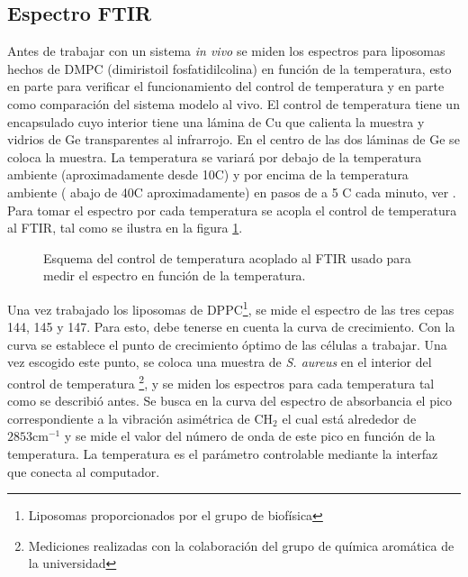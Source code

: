 \documentclass[%
 reprint,
 amsmath,amssymb,
 aps,
]{revtex4-2}
\begin{document}
 \subsection{Espectro FTIR}
Antes de trabajar con un sistema \textit{in vivo} se miden los espectros para liposomas hechos de  DMPC (dimiristoil fosfatidilcolina) en funci\'{o}n de la temperatura, esto en parte para verificar el funcionamiento del control de temperatura y en parte como comparaci\'{o}n del sistema modelo al vivo. El control de temperatura tiene un encapsulado cuyo interior tiene una l\'{a}mina de Cu que calienta la muestra y vidrios de Ge transparentes al infrarrojo. En el centro de las dos l\'{a}minas de Ge se coloca la muestra.  La temperatura se variar\'{a} por debajo de la temperatura ambiente (aproximadamente desde 10\textdegree C) y por encima de la temperatura ambiente ( abajo de 40\textdegree C aproximadamente) en pasos de a 5 \textdegree C cada minuto, ver \cite{Ocampo2010TheAureus}. Para tomar el espectro por cada temperatura se acopla el control de temperatura al FTIR, tal como se ilustra en la figura \ref{fig:mont2}.\\
\begin{figure}
 
  \caption{Esquema del control de temperatura acoplado al FTIR usado para medir el espectro en funci\'{o}n de la temperatura.}
  \label{fig:mont2}
\end{figure}
Una vez trabajado los liposomas de DPPC\footnote{Liposomas proporcionados por el grupo de biof\'{i}sica}, se mide el espectro de las tres cepas 144, 145 y 147. Para esto, debe tenerse en cuenta la curva de crecimiento. Con la curva se establece el punto de crecimiento \'{o}ptimo de las c\'{e}lulas a trabajar. Una vez escogido este punto, se coloca una muestra de \textit{S. aureus} en el interior del control de temperatura \footnote{Mediciones realizadas con la colaboraci\'{o}n del grupo de qu\'{i}mica arom\'{a}tica de la universidad},  y se miden los espectros para cada temperatura tal como se describi\'{o} antes.
Se busca en la curva del espectro de absorbancia el pico correspondiente a la vibraci\'{o}n asim\'{e}trica de CH$_{2}$ el cual est\'{a} alrededor de $2853 \mathrm{cm}^{-1}$ y se mide el valor del n\'{u}mero de onda de este pico en funci\'{o}n de la temperatura. La temperatura es el par\'{a}metro controlable mediante la interfaz que conecta al computador.
\end{document}
